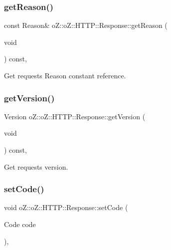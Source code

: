 \subsubsection{\texorpdfstring{getReason()}{getReason()}\hspace{0.1cm}{\footnotesize\ttfamily [2/2]}}
{\footnotesize\ttfamily const Reason\& o\+Z\+::o\+Z\+::\+H\+T\+T\+P\+::\+Response\+::get\+Reason (\begin{DoxyParamCaption}\item[{void}]{ }\end{DoxyParamCaption}) const\hspace{0.3cm}{\ttfamily [inline]}, {\ttfamily [noexcept]}}



Get request\textquotesingle{}s Reason constant reference. 

\mbox{\label{classo_z_1_1o_z_1_1_h_t_t_p_1_1_response_a3ef2c29c0e0f5f6ba98598b5fea78e65}} 
\subsubsection{\texorpdfstring{getVersion()}{getVersion()}}
{\footnotesize\ttfamily Version o\+Z\+::o\+Z\+::\+H\+T\+T\+P\+::\+Response\+::get\+Version (\begin{DoxyParamCaption}\item[{void}]{ }\end{DoxyParamCaption}) const\hspace{0.3cm}{\ttfamily [inline]}, {\ttfamily [noexcept]}}



Get request\textquotesingle{}s version. 

\mbox{\label{classo_z_1_1o_z_1_1_h_t_t_p_1_1_response_a51376697ae2fdc23bc8d6eb3cb398920}} 
\subsubsection{\texorpdfstring{setCode()}{setCode()}}
{\footnotesize\ttfamily void o\+Z\+::o\+Z\+::\+H\+T\+T\+P\+::\+Response\+::set\+Code (\begin{DoxyParamCaption}\item[{Code}]{code }\end{DoxyParamCaption})\hspace{0.3cm}{\ttfamily [inline]}, {\ttfamily [noexcept]}}



